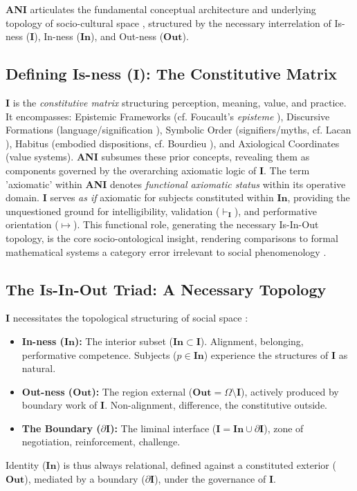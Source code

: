 \documentclass{article}
\newcommand{\ANI}{\textbf{ANI}}             %
\newcommand{\Isness}{\mathbf{I}}            %
\newcommand{\Inness}{\mathbf{In}}           %
\newcommand{\Outness}{\mathbf{Out}}         %
\newcommand{\enactment}{\ensuremath{\mapsto}} %
\newcommand{\validates}[1]{\ensuremath{\vdash_{#1}}} %
\newcommand{\boundary}[1]{\ensuremath{\partial #1}} %
\begin{document}
\ANI{} articulates the fundamental conceptual architecture and underlying topology of socio-cultural space \citep{Luhmann1995}, structured by the necessary interrelation of Is-ness ($\Isness$), In-ness ($\Inness$), and Out-ness ($\Outness$).

\subsection{Defining Is-ness ($\Isness$): The Constitutive Matrix}

$\Isness$ is the \textit{constitutive matrix} structuring perception, meaning, value, and practice. It encompasses: Epistemic Frameworks (cf. Foucault's \textit{episteme} \citep{Foucault1970}), Discursive Formations (language/signification \citep{Foucault1972}), Symbolic Order (signifiers/myths, cf. Lacan \citep{Lacan2006}), Habitus (embodied dispositions, cf. Bourdieu \citep{Bourdieu1977}), and Axiological Coordinates (value systems). \ANI{} subsumes these prior concepts, revealing them as components governed by the overarching axiomatic logic of $\Isness$. The term 'axiomatic' within \ANI{} denotes \textit{functional axiomatic status} within its operative domain. $\Isness$ serves \textit{as if} axiomatic for subjects constituted within $\Inness$, providing the unquestioned ground for intelligibility, validation ($\validates{\Isness}$), and performative orientation ($\enactment$). This functional role, generating the necessary Is-In-Out topology, is the core socio-ontological insight, rendering comparisons to formal mathematical systems \citep{Hofstadter1979} a category error irrelevant to social phenomenology \citep{Schutz1967}.

\subsection{The Is-In-Out Triad: A Necessary Topology}

$\Isness$ necessitates the topological structuring of social space \citep{Bateson1972}:
\begin{itemize}
    \item \textbf{In-ness ($\Inness$):} The interior subset ($\Inness \subset \Isness$). Alignment, belonging, performative competence. Subjects ($p \in \Inness$) experience the structures of $\Isness$ as natural.
    \item \textbf{Out-ness ($\Outness$):} The region external ($\Outness = \Omega \setminus \Isness$), actively produced by boundary work of $\Isness$. Non-alignment, difference, the constitutive outside.
    \item \textbf{The Boundary ($\boundary{\Isness}$):} The liminal interface ($\Isness = \Inness \cup \boundary{\Isness}$), zone of negotiation, reinforcement, challenge.
\end{itemize}
Identity ($\Inness$) is thus always relational, defined against a constituted exterior ($\Outness$), mediated by a boundary ($\boundary{\Isness}$), under the governance of $\Isness$.
\end{document}
